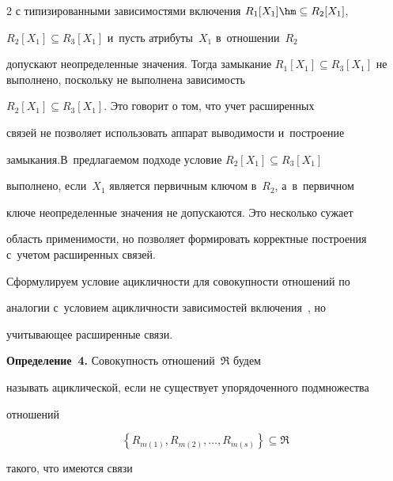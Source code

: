 \begin{multicols}{2}
с типизированными зависимостями включения $R_1[X_1]\hm\subseteq R_2[X_1]$,

$R_2[X_1]\subseteq R_3[X_1]$ и~пусть атрибуты~$X_1$ в~отношении~$R_2$

допускают неопределенные значения. Тогда замыкание $R_1[X_1]\subseteq

R_3[X_1]$ не выполнено, поскольку не выполнена зависимость\linebreak

$R_2[X_1]\subseteq R_3[X_1]$. Это говорит о том, что учет расширенных

связей не позволяет использовать ап\-парат выводимости и~построение

замыкания.\linebreak В~предлагаемом подходе условие $R_2[X_1]\subseteq R_3[X_1]$

выполнено, если~$X_1$ является первичным ключом в~$R_2$, а~в~первичном

ключе неопределенные значения не допускаются. Это несколько сужает

область применимости, но позволяет формировать корректные построения с~учетом расширенных связей.



  Сформулируем условие ацикличности для совокупности отношений по

аналогии с~условием ацик\-лич\-ности зависимостей включения~\cite{6-z}, но

учитывающее расширенные связи.



  \smallskip



  \noindent

  \textbf{Определение~4.} Совокупность отношений~$\mathfrak{R}$ будем

называть ациклической, если не существует упорядоченного подмножества

отношений



\noindent

  \begin{equation*}

  \left\{ R_{m(1)}, R_{m(2)}, \ldots, R_{m(s)} \right\} \subseteq \mathfrak{R}


  \end{equation*}

такого, что имеются связи




\end{multicols}

